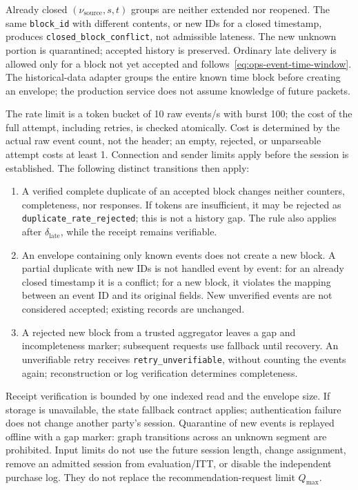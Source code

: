\documentclass[12pt,a4paper]{article}
\newcommand{\code}[1]{{\ttfamily\small\nolinkurl{#1}}}
\theoremstyle{plainru}
\begin{document}
Already closed $(\nu_{\mathrm{source}},s,t)$ groups are neither extended nor
reopened. The same \code{block_id} with different contents, or new IDs
for a closed timestamp, produces \code{closed_block_conflict}, not admissible
lateness. The new unknown portion is quarantined; accepted history
is preserved. Ordinary late delivery is allowed only for a block
not yet accepted and follows~\eqref{eq:ops-event-time-window}.
The historical-data adapter groups the entire known time block
before creating an envelope; the production service does not assume knowledge of future packets.

The rate limit is a token bucket of 10 raw events/s with burst 100;
the cost of the full attempt, including retries, is checked atomically.
Cost is determined by the actual raw event count, not the header;
an empty, rejected, or unparseable attempt costs at least 1.
Connection and sender limits apply before the session is established.
The following distinct transitions then apply:
\begin{enumerate}
\item A verified complete duplicate of an accepted block changes neither counters,
completeness, nor responses. If tokens are insufficient, it may be rejected as
\code{duplicate_rate_rejected}; this is not a history gap. The rule also applies
after $\delta_{\mathrm{late}}$, while the receipt remains verifiable.
\item An envelope containing only known events does not create a new
block. A partial duplicate with new IDs is not handled event by event:
for an already closed timestamp it is a conflict; for a new block, it violates
the mapping between an event ID and its original fields. New unverified events
are not considered accepted; existing records are unchanged.
\item A rejected new block from a trusted aggregator leaves
a gap and incompleteness marker; subsequent requests use fallback
until recovery. An unverifiable retry receives
\code{retry_unverifiable}, without counting the events again;
reconstruction or log verification determines completeness.
\end{enumerate}
Receipt verification is bounded by one indexed read and the
envelope size. If storage is unavailable, the state fallback contract
applies; authentication failure does not change another party's session.
Quarantine of new events is replayed offline with a gap marker:
graph transitions across an unknown segment are prohibited. Input limits
do not use the future session length, change assignment, remove
an admitted session from evaluation/ITT, or disable the independent purchase log.
They do not replace the recommendation-request limit $Q_{\max}$.
\end{document}
